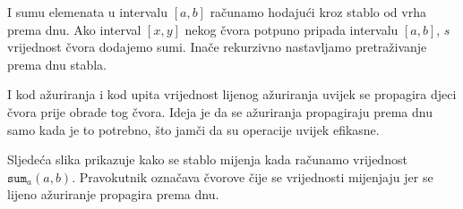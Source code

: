 \begin{center}
\end{center}

I sumu elemenata u intervalu $[a,b]$ računamo
hodajući kroz stablo od vrha prema dnu.
Ako interval $[x,y]$ nekog čvora potpuno pripada
intervalu $[a,b]$, $s$ vrijednost čvora dodajemo sumi.
Inače rekurzivno nastavljamo pretraživanje
prema dnu stabla.

I kod ažuriranja i kod upita
vrijednost lijenog ažuriranja uvijek se propagira
djeci čvora
prije obrade tog čvora.
Ideja je da se ažuriranja propagiraju
prema dnu samo kada je to potrebno,
što jamči da su operacije uvijek efikasne.

Sljedeća slika prikazuje kako se stablo mijenja
kada računamo vrijednost $\texttt{sum}_a(a,b)$.
Pravokutnik označava čvorove čije se vrijednosti mijenjaju
jer se lijeno ažuriranje propagira prema dnu.

